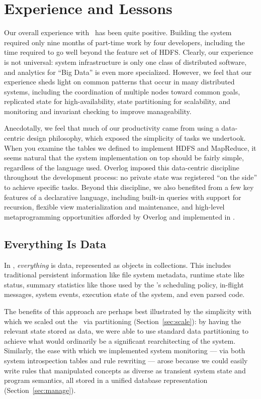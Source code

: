 \section{Experience and Lessons}
\label{sec:lessons}

Our overall experience with \BOOMA\ has been quite positive. Building the system
required only nine months of part-time work by four developers, including the
time required to go well beyond the feature set of HDFS\@. Clearly, our
experience is not universal: system infrastructure is only one class of
distributed software, and analytics for ``Big Data'' is even more
specialized. However, we feel that our experience sheds light on common patterns
that occur in many distributed systems, including the coordination of multiple
nodes toward common goals, replicated state for high-availability, state
partitioning for scalability, and monitoring and invariant checking to improve
manageability.

Anecdotally, we feel that much of our productivity came from using a data-centric
design philosophy, which exposed the simplicity of tasks we undertook.  When you
examine the tables we defined to implement HDFS and MapReduce, it seems natural
that the system implementation on top should be fairly simple, regardless of the
language used. Overlog imposed this data-centric discipline throughout the
development process: no private state was registered ``on the side'' to achieve
specific tasks.  Beyond this discipline, we also benefited from a few key
features of a declarative language, including built-in queries with support for
recursion, flexible view materialization and maintenance, and high-level
metaprogramming opportunities afforded by Overlog and implemented in \JOL.

\subsection{Everything Is Data}
In \BOOMA, \emph{everything} is data, represented as objects in collections.
This includes traditional persistent information like file system metadata,
runtime state like \TT status, summary statistics like those used by the \JT's
scheduling policy, in-flight messages, system events, execution state of the
system, and even parsed code.

The benefits of this approach are perhaps best illustrated by the simplicity with which we scaled out the \NN\ via partitioning (Section~\ref{sec:scale}): by having the relevant state stored as data, we were able to use standard data partitioning to achieve what would ordinarily be a significant rearchitecting of the system. Similarly, the ease with which we implemented system monitoring --- via both system introspection tables and rule rewriting --- arose because we could easily write rules that manipulated concepts as diverse as transient system state and program semantics, all stored in a unified database representation (Section~\ref{sec:manage}).

